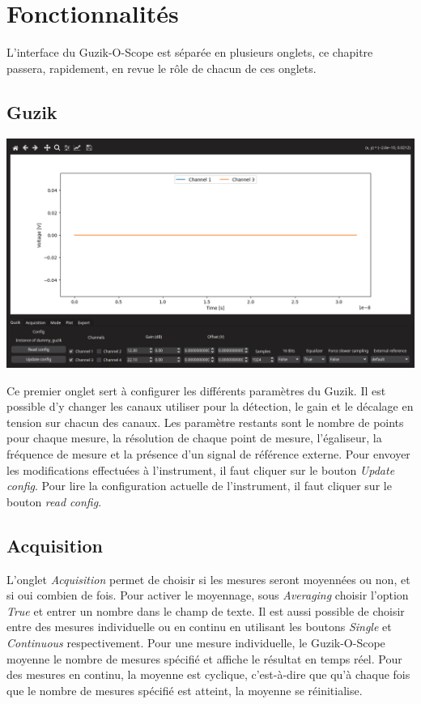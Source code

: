 \documentclass[openright,letterpaper,12pt]{book}
\begin{document}
\chapter*{Fonctionnalités}
L'interface du Guzik-O-Scope est séparée en plusieurs onglets, ce chapitre 
passera, rapidement, en revue le rôle de chacun de ces onglets.

\section*{Guzik}
\begin{center}
		\includegraphics[width=\textwidth]{Figures/Guzik.png}
\end{center}

Ce premier onglet sert à configurer les différents paramètres du Guzik. 
Il est possible d'y changer les canaux utiliser pour la détection, le gain et 
le décalage en tension sur chacun des canaux. 
Les paramètre restants sont le nombre de points pour chaque mesure, la 
résolution de chaque point de mesure, l'égaliseur, la fréquence de mesure et 
la présence d'un signal de référence externe. 
Pour envoyer les modifications effectuées à l'instrument, il faut cliquer sur 
le bouton \textit{Update config}. 
Pour lire la configuration actuelle de l'instrument, il faut cliquer sur le 
bouton \textit{read config}.

\section*{Acquisition}\vspace{1cm}

L'onglet \textit{Acquisition} permet de choisir si les mesures seront moyennées 
ou non, et si oui combien de fois. 
Pour activer le moyennage, sous \textit{Averaging} choisir l'option 
\textit{True} et entrer un nombre dans le champ de texte.
Il est aussi possible de choisir entre des mesures individuelle ou en continu 
en utilisant les boutons \textit{Single} et \textit{Continuous} respectivement. 
Pour une mesure individuelle, le Guzik-O-Scope moyenne le nombre de mesures 
spécifié et affiche le résultat en temps réel. 
Pour des mesures en continu, la moyenne est cyclique, c'est-à-dire que qu'à 
chaque fois que le nombre de mesures spécifié est atteint, la moyenne se 
réinitialise.\vspace{1cm}
\end{document}
